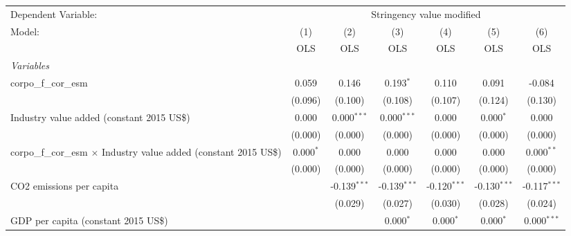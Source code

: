 
\begingroup
\centering
\begin{tabular}{lcccccc}
   \toprule
   Dependent Variable: & \multicolumn{6}{c}{Stringency value modified}\\
   Model:                                                                     & (1)         & (2)            & (3)            & (4)            & (5)            & (6)\\  
                                                                              &  OLS        & OLS            & OLS            & OLS            & OLS            & OLS\\  
   \midrule
   \emph{Variables}\\
   corpo\_f\_cor\_esm                                                         & 0.059       & 0.146          & 0.193$^{*}$    & 0.110          & 0.091          & -0.084\\   
                                                                              & (0.096)     & (0.100)        & (0.108)        & (0.107)        & (0.124)        & (0.130)\\   
   Industry value added (constant 2015 US\$)                                  & 0.000       & 0.000$^{***}$  & 0.000$^{***}$  & 0.000          & 0.000$^{*}$    & 0.000\\   
                                                                              & (0.000)     & (0.000)        & (0.000)        & (0.000)        & (0.000)        & (0.000)\\   
   corpo\_f\_cor\_esm $\times$ Industry value added (constant 2015 US\$)      & 0.000$^{*}$ & 0.000          & 0.000          & 0.000          & 0.000          & 0.000$^{**}$\\   
                                                                              & (0.000)     & (0.000)        & (0.000)        & (0.000)        & (0.000)        & (0.000)\\   
   CO2 emissions per capita                                                   &             & -0.139$^{***}$ & -0.139$^{***}$ & -0.120$^{***}$ & -0.130$^{***}$ & -0.117$^{***}$\\   
                                                                              &             & (0.029)        & (0.027)        & (0.030)        & (0.028)        & (0.024)\\   
   GDP per capita (constant 2015 US\$)                                        &             &                & 0.000$^{*}$    & 0.000$^{*}$    & 0.000$^{*}$    & 0.000$^{***}$\\   

\end{tabular}
